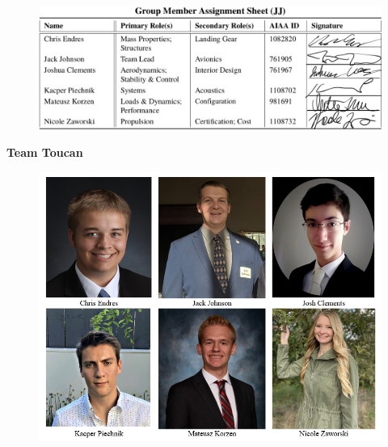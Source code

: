 \documentclass[conf]{new-aiaa}
\begin{document}


\newpage

\begin{figure}[!h]
    \centering
    \includegraphics[width=\linewidth]{Photos/signatures.JPG}
    \label{fig:my_label}
\end{figure}

\begin{center}
\large{ \textbf{Team Toucan}}
\end{center}

\begin{figure}[!h]
    \centering
    \includegraphics[width=\linewidth]{Photos/Toucan Headshots.png}
    \label{fig:my_label}
\end{figure}
\end{document}
